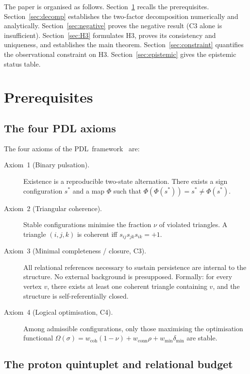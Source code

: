 \documentclass[11pt,a4paper]{article}
\theoremstyle{definition}
\newcommand{\PDL}{\textnormal{PDL}}
\begin{document}
The paper is organised as follows.
Section~\ref{sec:prereq} recalls the prerequisites.
Section~\ref{sec:decomp} establishes the two-factor decomposition
numerically and analytically.
Section~\ref{sec:negative} proves the negative result (C3 alone
is insufficient).
Section~\ref{sec:H3} formulates H3, proves its consistency and
uniqueness, and establishes the main theorem.
Section~\ref{sec:constraint} quantifies the observational constraint
on H3.
Section~\ref{sec:epistemic} gives the epistemic status table.

\section{Prerequisites}
\label{sec:prereq}

\subsection{The four PDL axioms}

The four axioms of the \PDL\ framework~\cite{PDL_Main_2026} are:
\begin{description}
\item[Axiom~1 (Binary pulsation).] Existence is a reproducible
  two-state alternation. There exists a sign configuration $s^*$
  and a map $\Phi$ such that $\Phi(\Phi(s^*)) = s^* \neq \Phi(s^*)$.
\item[Axiom~2 (Triangular coherence).] Stable configurations minimise
  the fraction $\nu$ of violated triangles. A triangle $(i,j,k)$ is
  coherent iff $s_{ij}s_{jk}s_{ik} = +1$.
\item[Axiom~3 (Minimal completeness / closure, C3).] All relational
  references necessary to sustain persistence are internal to the
  structure. No external background is presupposed. Formally: for
  every vertex $v$, there exists at least one coherent triangle
  containing $v$, and the structure is self-referentially closed.
\item[Axiom~4 (Logical optimisation, C4).] Among admissible
  configurations, only those maximising the optimisation functional
  $\Omega(\sigma) = w_\mathrm{coh}(1-\nu) + w_\mathrm{conn}\rho
  + w_\mathrm{min}\delta_\mathrm{min}$ are stable.
\end{description}

\subsection{The proton quintuplet and relational budget}
\end{document}

